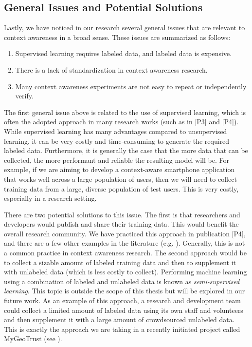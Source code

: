 \subsection{General Issues and Potential Solutions}
\label{sec:general_issues}

Lastly, we have noticed in our research several general issues that are relevant to context awareness in a broad sense. These issues are summarized as follows:
%
\begin{enumerate}
 \item Supervised learning requires labeled data, and labeled data is expensive.
 \item There is a lack of standardization in context awareness research.
 \item Many context awareness experiments are not easy to repeat or independently verify.
\end{enumerate}


The first general issue above is related to the use of supervised learning, which is often the adopted approach in many research works (such as in [P3] and [P4]). While supervised learning has many advantages compared to unsupervised learning, it can be very costly and time-consuming to generate the required labeled data. Furthermore, it is generally the case that the more data that can be collected, the more performant and reliable the resulting model will be. For example, if we are aiming to develop a context-aware smartphone application that works well across a large population of users, then we will need to collect training data from a large, diverse population of test users. This is very costly, especially in a research setting.

There are two potential solutions to this issue. The first is that researchers and developers would publish and share their training data. This would benefit the overall research community. We have practiced this approach in publication [P4], and there are a few other examples in the literature (e.g. \cite{yu2014big} \cite{ordonez2013activity}). Generally, this is not a common practice in context awareness research. The second approach would be to collect a sizable amount of labeled training data and then to supplement it with unlabeled data (which is less costly to collect). Performing machine learning using a combination of labeled and unlabeled data is known as \emph{semi-supervised learning}. This topic is outside the scope of this thesis but will be explored in our future work. As an example of this approach, a research and development team could collect a limited amount of labeled data using its own staff and volunteers and then supplement it with a large amount of crowdsourced unlabeled data. This is exactly the approach we are taking in a recently initiated project called MyGeoTrust (see \cite{Guinness2015}).

